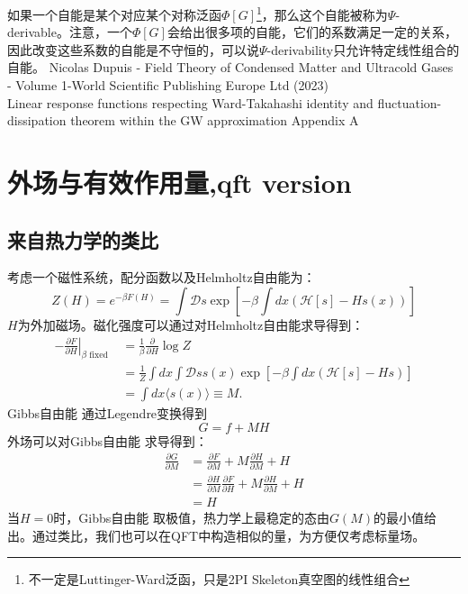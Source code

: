 \documentclass[10pt,openany]{book}
\theoremstyle{thmstyle} %
\theoremstyle{defstyle} %
\theoremstyle{prostyle} %
\begin{document}
如果一个自能是某个对应某个对称泛函$ \Phi[G] $\footnote{不一定是Luttinger-Ward泛函，只是2PI Skeleton真空图的线性组合}，那么这个自能被称为$ \Psi $-derivable。注意，一个$ \Phi[G] $会给出很多项的自能，它们的系数满足一定的关系，因此改变这些系数的自能是不守恒的，可以说$ \Psi $-derivability只允许特定线性组合的自能。       
Nicolas Dupuis - Field Theory of Condensed Matter and Ultracold Gases - Volume 1-World Scientific Publishing Europe Ltd (2023)\\
Linear response functions respecting Ward-Takahashi identity and fluctuation-dissipation
theorem within the GW approximation Appendix A
\section{外场与有效作用量,qft version}
\subsection{来自热力学的类比}
考虑一个磁性系统，配分函数以及Helmholtz自由能为：
\begin{equation}
  Z(H)=e^{-\beta F(H)}=\int \mathcal{D} s \exp \left[-\beta \int d x(\mathcal{H}[s]-H s(x))\right]
\end{equation}
$ H $为外加磁场。磁化强度可以通过对Helmholtz自由能求导得到：
\begin{equation*}
  \begin{aligned}
    -\left.\frac{\partial F}{\partial H}\right|_{\beta \text { fixed }} & =\frac{1}{\beta} \frac{\partial}{\partial H} \log Z \\
    & =\frac{1}{Z} \int d x \int \mathcal{D} s s(x) \exp \left[-\beta \int d x(\mathcal{H}[s]-H s)\right] \\
    & =\int d x\langle s(x)\rangle \equiv M .
    \end{aligned}
\end{equation*}
Gibbs自由能 通过Legendre变换得到
\begin{equation*}
  G=f+MH
\end{equation*}
外场可以对Gibbs自由能 求导得到：
\begin{equation}
  \begin{aligned}
    \frac{\partial G}{\partial M} & =\frac{\partial F}{\partial M}+M \frac{\partial H}{\partial M}+H \\
    & =\frac{\partial H}{\partial M} \frac{\partial F}{\partial H}+M \frac{\partial H}{\partial M}+H \\
    & =H
    \end{aligned}
\end{equation}
当$ H=0 $时，Gibbs自由能 取极值，热力学上最稳定的态由$ G(M) $的最小值给出。通过类比，我们也可以在QFT中构造相似的量，为方便仅考虑标量场。
\end{document}
